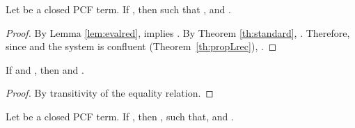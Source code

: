 \documentclass{article}
\begin{document}
\begin{theorem} Let  be a closed PCF term. If , then  such that , and .
\end{theorem}
\begin{proof}
By Lemma \ref{lem:evalred},  implies . 
By Theorem \ref{th:standard}, . Therefore, since
 and  the system is confluent (Theorem~\ref{th:propLrec}), 
. 
\end{proof}

\begin{lemma}\label{eqeval}If  and , then
 and .
\end{lemma}
\begin{proof} 
By transitivity of the equality relation.
\end{proof}
\begin{theorem} Let  be a closed PCF term.
If , then , such that, 
and .
\end{theorem}
\end{document}
